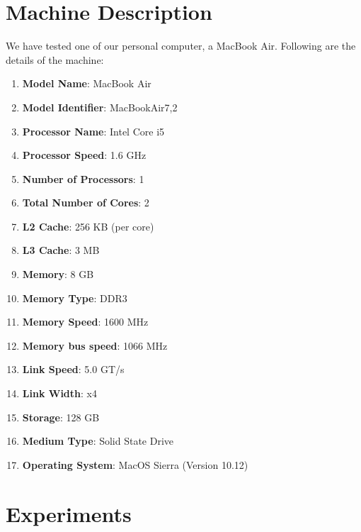 \documentclass[conference]{IEEEtran}
\begin{document}
\section{Machine Description}
We have tested one of our personal computer, a MacBook Air. Following are the details of the machine:
\begin{enumerate}

\item
\textbf{Model Name}: MacBook Air
\item
\textbf{Model Identifier}: MacBookAir7,2
\item
\textbf{Processor Name}: Intel Core i5
\item
\textbf{Processor Speed}:  1.6 GHz
\item
\textbf{Number of Processors}: 1
\item
\textbf{Total Number of Cores}:  2
\item
\textbf{L2 Cache}: 256 KB (per core)
\item
\textbf{L3 Cache}: 3 MB
\item
\textbf{Memory}: 8 GB
\item
\textbf{Memory Type}: DDR3
\item
\textbf{Memory Speed}:  1600 MHz
\item
\textbf{Memory bus speed}: 1066 MHz 
\item
\textbf{Link Speed}: 5.0 GT/s
\item
\textbf{Link Width}: x4
\item
\textbf{Storage}: 128 GB 
\item
\textbf{Medium Type}:  Solid State Drive
\item
\textbf{Operating System}: MacOS Sierra (Version 10.12)

\end{enumerate}  


\section{Experiments}
\end{document}

